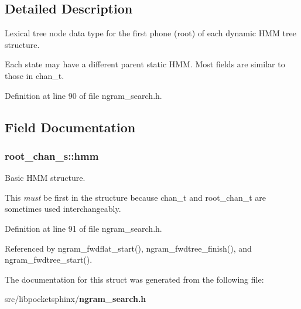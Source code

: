 \subsection{Detailed Description}
Lexical tree node data type for the first phone (root) of each dynamic H\-M\-M tree structure. 

Each state may have a different parent static H\-M\-M. Most fields are similar to those in chan\-\_\-t. 

Definition at line 90 of file ngram\-\_\-search.\-h.



\subsection{Field Documentation}
\subsubsection[{hmm}]{ root\-\_\-chan\-\_\-s\-::hmm}\label{structroot__chan__s_a9d4d92ffa8b4079202ddebe3ba0eb290}


Basic H\-M\-M structure. 

This {\itshape must} be first in the structure because chan\-\_\-t and root\-\_\-chan\-\_\-t are sometimes used interchangeably. 

Definition at line 91 of file ngram\-\_\-search.\-h.



Referenced by ngram\-\_\-fwdflat\-\_\-start(), ngram\-\_\-fwdtree\-\_\-finish(), and ngram\-\_\-fwdtree\-\_\-start().



The documentation for this struct was generated from the following file\-:\begin{DoxyCompactItemize}
\item 
src/libpocketsphinx/{\bf ngram\-\_\-search.\-h}\end{DoxyCompactItemize}
